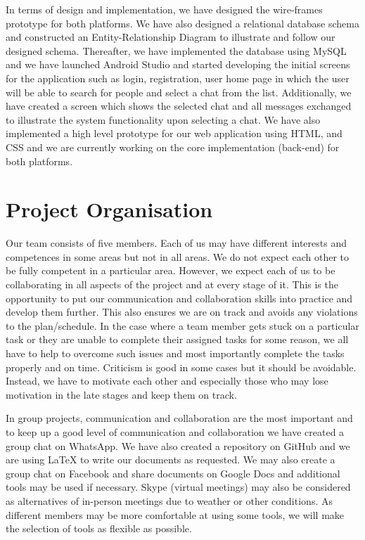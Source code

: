 \documentclass{article}
\begin{document}
\begin{flushleft}
In terms of design and implementation, we have designed the wire-frames prototype for both platforms. We have also designed a relational database schema and constructed an Entity-Relationship Diagram to illustrate and follow our designed schema. Thereafter, we have implemented the database using MySQL and we have launched Android Studio and started developing the initial screens for the application such as login, registration, user home page in which the user will be able to search for people and select a chat from the list. Additionally, we have created a screen which shows the selected chat and all messages exchanged to illustrate the system functionality upon selecting a chat. 
We have also implemented a high level prototype for our web application using HTML, and CSS and we are currently working on the core implementation (back-end) for both platforms. 
\end{flushleft}


\section{Project Organisation}

\begin{flushleft}
Our team consists of five members. Each of us may have different interests and competences in some areas but not in all areas. We do not expect each other to be fully competent in a particular area. However, we expect each of us to be collaborating in all aspects of the project and at every stage of it. This is the opportunity to put our communication and collaboration skills into practice and develop them further. This also ensures we are on track and avoids any violations to the plan/schedule. In the case where a team member gets stuck on a particular task or they are unable to complete their assigned tasks for some reason, we all have to help to overcome such issues and most importantly complete the tasks properly and on time. Criticism is good in some cases but it should be avoidable. Instead, we have to motivate each other and especially those who may lose motivation in the late stages and keep them on track.
\end{flushleft}

\begin{flushleft}
In group projects, communication and collaboration are the most important and to keep up a good level of communication and collaboration we have created a group chat on WhatsApp. We have also created a repository on GitHub and we are using LaTeX to write our documents as requested. We may also create a group chat on Facebook and share documents on Google Docs and additional tools may be used if necessary. Skype (virtual meetings) may also be considered as alternatives of in-person meetings due to weather or other conditions. As different members may be more comfortable at using some tools, we will make the selection of tools as flexible as possible.
\end{flushleft}
\end{document}

